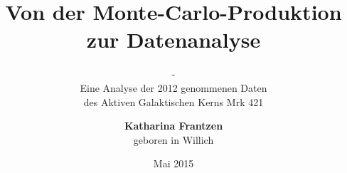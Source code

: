 









\newcommand{\thetitle}{Von der Monte-Carlo-Produktion zur Datenanalyse}
\newcommand{\thesubtitle}{-\\ Eine Analyse der 2012 genommenen Daten \\ des Aktiven Galaktischen Kerns Mrk 421}


\newcommand{\Geburtsort}{Willich}
\newcommand{\Jahr}{Mai 2015}
\newcommand{\Lehrstuhl}{Experimentelle Physik V}
\newcommand{\Betreuer}{Prof. Dr. Erstgutachter}
\newcommand{\Zweitgutachter}{Prof. Dr. Zweitgutachter}
\newcommand{\Abgabedatum}{11. Juli 2014}

\author{
   \textbf{Katharina Frantzen}\\
   geboren in \Geburtsort
}

\titlehead{
   \texttt{[image: logos/tu-logo.pdf]}
}
\title{\thetitle}
\subtitle{\thesubtitle}

\date{\Jahr}

\subject{Arbeit zur Erlangung des akademischen Grades eines \\Doktors der Naturwissenschaften \\(Dr. rer. nat.)}
\publishers{Lehrstuhl für \Lehrstuhl \\ Fakultät Physik \\ Technische Universität Dortmund}



